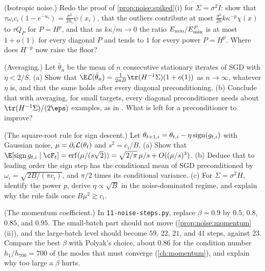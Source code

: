 \begin{refsection}
\begin{exercises}
\item \variation (Isotropic noise.) Redo the proof of \cref{prop:noise:spiked}(i) for $\Sigma=\sigma^2I$: show that $\tau\omega_ic_i(1-e^{-u_i})=\frac{\sigma^2}{2h_i}\psi(x_i)$, that the outliers contribute at most $\frac{\sigma^2}{2h}k\kappa^{-p}\chi(x)$ to $\tau Q_P$ for $P=H^p$, and that as $k\kappa/m\to0$ the ratio $E_{\min}/E_{\min}^P$ is at most $1+o(1)$ for every diagonal $P$ and tends to $1$ for every power $P=H^p$. Where does $H^{-p}$ now raise the floor?\label{ex:noise:isotropic}

\item \variation\hard (Averaging.) Let $\bar\theta_n$ be the mean of $n$ consecutive stationary iterates of SGD with $\eta<2/S$. (a) Show that $\E\Loss(\bar\theta_n)=\frac1{2nB}\tr(H^{-1}\Sigma)(1+o(1))$ as $n\to\infty$, whatever $\eta$ is, and that the same holds after every diagonal preconditioning. (b) Conclude that with averaging, for small targets, every diagonal preconditioner needs about $\tr(H^{-1}\Sigma)/(2\eps)$ examples, as in \textcite{PolyakJuditsky1992}. What is left for a preconditioner to improve? \label{ex:noise:averaging}

\item \variation (The square-root rule for sign descent.) Let $\theta_{t+1,i}=\theta_{t,i}-\eta\operatorname{sign}(g_{t,i})$ with Gaussian noise, $\mu=\partial_i\mathcal{L}(\theta_t)$ and $s^2=c_i/B$. (a) Show that $\E[\sign g_{t,i}\mid\cF_t]=\erf(\mu/(s\sqrt2))=\sqrt{2/\pi}\,\mu/s+O((\mu/s)^3)$. (b) Deduce that to leading order the sign step has the conditional mean of SGD preconditioned by $\omega_i=\sqrt{2B/(\pi c_i)}$, and $\pi/2$ times its conditional variance. (c) For $\Sigma=\sigma^2H$, identify the power $p$, derive $\eta\propto\sqrt B$ in the noise-dominated regime, and explain why the rule fails once $B\mu^2\gtrsim c_i$.\label{ex:noise:sign}

\item \simulation (The momentum coefficient.) In \texttt{11-noise-steps.py}, replace $\beta=0.9$ by $0.5$, $0.8$, $0.85$, and $0.95$. The small-batch part should not move (\cref{prop:noise:momentum}(ii)), and the large-batch level should become $59$, $22$, $21$, and $41$ steps, against $23$. Compare the best $\beta$ with Polyak's choice, about $0.86$ for the condition number $h_1/h_{700}=700$ of the modes that must converge (\cref{ch:momentum}), and explain why too large a $\beta$ hurts.\label{ex:noise:simbeta}


\end{exercises}
\end{refsection}

